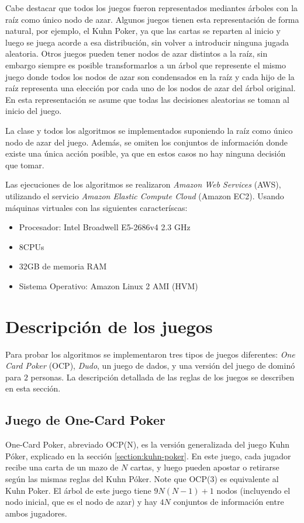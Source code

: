 Cabe destacar que todos los juegos fueron representados mediantes árboles con la raíz como único nodo de azar. Algunos juegos tienen esta representación de forma natural, por ejemplo, el Kuhn Poker, ya que las cartas se reparten al inicio y luego se juega acorde a esa distribución, sin volver a introducir ninguna jugada aleatoria. Otros juegos pueden tener nodos de azar distintos a la raíz, sin embargo siempre es posible transformarlos a un árbol que represente el mismo juego donde todos los nodos de azar son condensados en la raíz y cada hijo de la raíz representa una elección por cada uno de los nodos de azar del árbol original. En esta representación se asume que todas las decisiones aleatorias se toman al inicio del juego.

La clase  y todos los algoritmos se implementados suponiendo la raíz como único nodo de azar del juego. Además, se omiten los conjuntos de información donde existe una única acción posible, ya que en estos casos no hay ninguna decisión que tomar.

Las ejecuciones de los algoritmos se realizaron \textit{Amazon Web Services} (AWS), utilizando el servicio \textit{Amazon Elastic Compute Cloud} (Amazon EC2). Usando máquinas virtuales con las siguientes caracteríscas:
\begin{itemize}[noitemsep]
    \item Procesador: Intel Broadwell E5-2686v4 2.3 GHz
    \item 8CPUs
    \item 32GB de memoria RAM
    \item Sistema Operativo: Amazon Linux 2 AMI (HVM)
\end{itemize}


\section{Descripción de los juegos}
\label{section-description-juegos-forma-extensiva}

Para probar los algoritmos se implementaron tres tipos de juegos diferentes: \textit{One Card Poker} (OCP), \textit{Dudo}, un juego de dados, y una versión del juego de dominó para $2$ personas. La descripción detallada de las reglas de los juegos se describen en esta sección.

\subsection*{Juego de One-Card Poker}
One-Card Poker, abreviado OCP(N), es la versión generalizada del juego Kuhn Póker, explicado en la sección \ref{section:kuhn-poker}. En este juego, cada jugador recibe una carta de un mazo de $N$ cartas, y luego pueden apostar o retirarse según las mismas reglas del Kuhn Póker. Note que OCP(3) es equivalente al Kuhn Poker. El árbol de este juego tiene $9N(N-1)+1$ nodos (incluyendo el nodo inicial, que es el nodo de azar) y hay $4N$ conjuntos de información entre ambos jugadores. 

